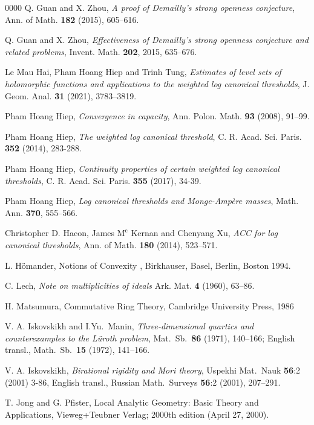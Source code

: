 \documentclass[a4paper,oneside,reqno,11pt]{article}
\begin{document}
\begin{thebibliography}{0000}
 Q. Guan and X. Zhou, {\it A proof of Demailly’s strong openness conjecture}, Ann. of Math. {\bf 182} (2015), 605--616.

 Q. Guan and X. Zhou, {\it Effectiveness of Demailly’s strong openness conjecture and related problems}, Invent. Math. {\bf 202}, 2015, 635--676.

 Le Mau Hai, Pham Hoang Hiep and Trinh Tung, {\it Estimates of level sets of holomorphic functions and applications to the weighted log canonical thresholds},  J. Geom. Anal. {\bf 31} (2021), 3783--3819.

  Pham Hoang Hiep, {\it Convergence in capacity}, Ann. Polon. Math. {\bf 93} (2008), 91--99.

 Pham Hoang Hiep, {\it The weighted log canonical threshold}, C. R. Acad. Sci. Paris. {\bf 352} (2014), 283-288.

 Pham Hoang Hiep, {\it Continuity properties of certain weighted log canonical thresholds}, C. R. Acad. Sci. Paris. {\bf 355} (2017), 34-39.

 Pham Hoang Hiep, {\it Log canonical thresholds and Monge-Amp\`{e}re masses}, Math. Ann. {\bf 370}, 555--566.

 Christopher D. Hacon, James $\text{M}^{ \text{c} }$ Kernan and Chenyang Xu, {\it ACC for log canonical thresholds}, Ann. of Math. {\bf 180} (2014), 523--571.

 L. H\"{o}mander, Notions of Convexity , Birkhauser, Basel, Berlin, Boston 1994.

C. Lech, {\it Note on multiplicities of ideals} Ark. Mat. {\bf 4} (1960), 63--86.

  H. Matsumura, Commutative Ring Theory, Cambridge University Press, 1986

 V. A. Iskovskikh and I.Yu.\ Manin, {\it Three-dimensional quartics and counterexamples to the L\"uroth problem}, Mat.\ Sb.\ {\bf 86} (1971), 140--166; English transl., Math.\ Sb.\ {\bf 15} (1972), 141--166.

 V. A. Iskovskikh, {\it Birational rigidity and Mori theory}, Uspekhi Mat.\ Nauk {\bf 56}:2 (2001) 3-86, English transl., Russian Math.\ Surveys {\bf 56}:2 (2001), 207--291.

  T. Jong and G. Pfister, Local Analytic Geometry: Basic Theory and Applications, Vieweg+Teubner Verlag; 2000th edition (April 27, 2000).


\end{thebibliography}
\end{document}
